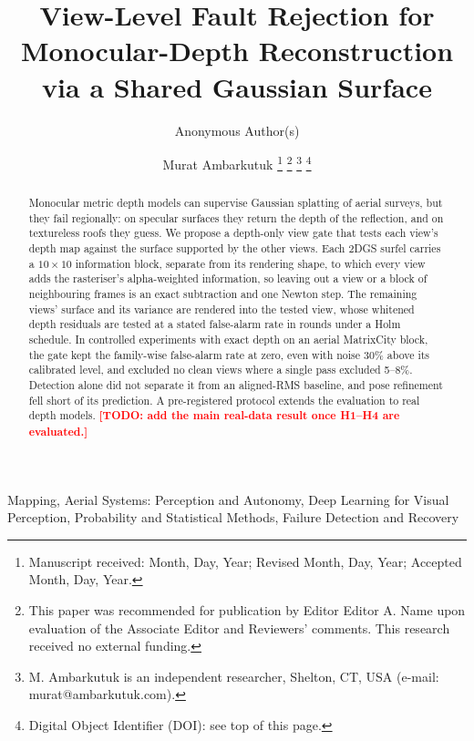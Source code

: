 \documentclass[letterpaper,journal,twoside]{IEEEtran}
\begin{document}
\title{View-Level Fault Rejection for Monocular-Depth Reconstruction via a Shared Gaussian Surface}

\ifanonymous
\author{Anonymous Author(s)}
\else
\author{Murat Ambarkutuk%
\thanks{Manuscript received: Month, Day, Year; Revised Month, Day, Year; Accepted Month, Day, Year.}%
\thanks{This paper was recommended for publication by Editor Editor A. Name upon evaluation of the
Associate Editor and Reviewers' comments. This research received no external funding.}%
\thanks{M. Ambarkutuk is an independent researcher, Shelton, CT, USA (e-mail: murat@ambarkutuk.com).}%
\thanks{Digital Object Identifier (DOI): see top of this page.}}
\fi

\maketitle

\begin{abstract}
Monocular metric depth models can supervise Gaussian splatting of aerial surveys, but they fail
regionally: on specular surfaces they return the depth of the reflection, and on textureless roofs they
guess. We propose a depth-only view gate that tests each view's depth map against the surface supported by
the other views. Each 2DGS surfel carries a $10\times10$ information block, separate from its rendering
shape, to which every view adds the rasteriser's alpha-weighted information, so leaving out a view or a
block of neighbouring frames is an exact subtraction and one Newton step. The remaining views' surface and
its variance are rendered into the tested view, whose whitened depth residuals are tested at a stated
false-alarm rate in rounds under a Holm schedule. In controlled experiments with exact depth on an aerial
MatrixCity block, the gate kept the family-wise false-alarm rate at zero, even with noise 30\% above
its calibrated level, and excluded no clean views where a single pass excluded 5--8\%. Detection alone did not
separate it from an aligned-RMS baseline, and pose refinement fell short of its prediction. A pre-registered protocol extends the evaluation to real depth models.
\textcolor{red}{\textbf{[TODO: add the main real-data result once H1--H4 are evaluated.]}}
\end{abstract}

\begin{IEEEkeywords}
Mapping, Aerial Systems: Perception and Autonomy, Deep Learning for Visual Perception,
Probability and Statistical Methods, Failure Detection and Recovery
\end{IEEEkeywords}
\end{document}
